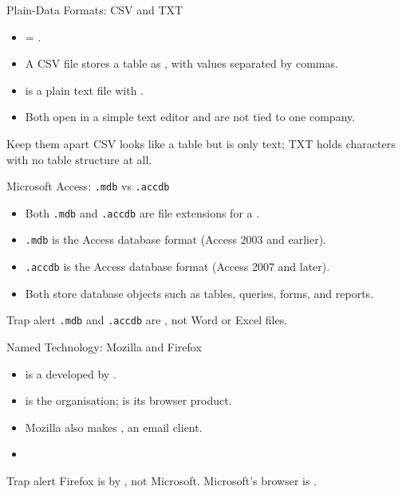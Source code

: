 \documentclass[aspectratio=169]{beamer}
\begin{document}
\begin{frame}{Plain-Data Formats: CSV and TXT}
  \begin{itemize}
    \item {} = .
    \item A CSV file stores a table as , with values
      separated by commas.
    \item {} is a plain text file with .
    \item Both open in a simple text editor and are not tied to one company.
  \end{itemize}
  \begin{block}{Keep them apart}
    CSV looks like a table but is only text; TXT holds characters with no
    table structure at all.
  \end{block}
\end{frame}

\begin{frame}{Microsoft Access: \texttt{.mdb} vs \texttt{.accdb}}
  \begin{itemize}
    \item Both \texttt{.mdb} and \texttt{.accdb} are file extensions for a
      .
    \item \texttt{.mdb} is the  Access database format (Access 2003
      and earlier).
    \item \texttt{.accdb} is the  Access database format (Access
      2007 and later).
    \item Both store database objects such as tables, queries, forms, and
      reports.
  \end{itemize}
  \begin{alertblock}{Trap alert}
    \texttt{.mdb} and \texttt{.accdb} are , not
    Word or Excel files.
  \end{alertblock}
\end{frame}

\begin{frame}{Named Technology: Mozilla and Firefox}
  \begin{itemize}
    \item {} is a  developed by .
    \item {} is the organisation;  is its browser
      product.
    \item Mozilla also makes , an email client.
    \item {}
  \end{itemize}
  \begin{alertblock}{Trap alert}
    Firefox is by , not Microsoft. Microsoft's browser is
    .
  \end{alertblock}
\end{frame}
\end{document}
